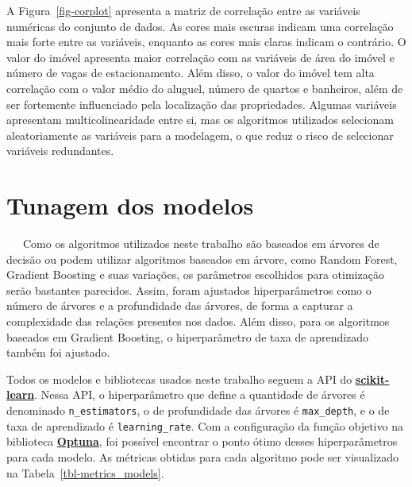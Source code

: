 \documentclass[
  12pt,
  a4paper,
]{scrreprt}
\begin{document}
\vspace{12pt}

A Figura~\ref{fig-corplot} apresenta a matriz de correlação entre as
variáveis numéricas do conjunto de dados. As cores mais escuras indicam
uma correlação mais forte entre as variáveis, enquanto as cores mais
claras indicam o contrário. O valor do imóvel apresenta maior correlação
com as variáveis de área do imóvel e número de vagas de estacionamento.
Além disso, o valor do imóvel tem alta correlação com o valor médio do
aluguel, número de quartos e banheiros, além de ser fortemente
influenciado pela localização das propriedades. Algumas variáveis
apresentam multicolinearidade entre si, mas os algoritmos utilizados
selecionam aleatoriamente as variáveis para a modelagem, o que reduz o
risco de selecionar variáveis redundantes.

\section{Tunagem dos modelos}\label{tunagem-dos-modelos}

~~~Como os algoritmos utilizados neste trabalho são baseados em árvores
de decisão ou podem utilizar algoritmos baseados em árvore, como Random
Forest, Gradient Boosting e suas variações, os parâmetros escolhidos
para otimização serão bastantes parecidos. Assim, foram ajustados
hiperparâmetros como o número de árvores e a profundidade das árvores,
de forma a capturar a complexidade das relações presentes nos dados.
Além disso, para os algoritmos baseados em Gradient Boosting, o
hiperparâmetro de taxa de aprendizado também foi ajustado.

\vspace{12pt}

Todos os modelos e bibliotecas usados neste trabalho seguem a API do
\href{https://scikit-learn.org/stable/}{\textbf{scikit-learn}}. Nessa
API, o hiperparâmetro que define a quantidade de árvores é denominado
\texttt{n\_estimators}, o de profundidade das árvores é
\texttt{max\_depth}, e o de taxa de aprendizado é
\texttt{learning\_rate}. Com a configuração da função objetivo na
biblioteca \href{https://optuna.org/}{\textbf{Optuna}}, foi possível
encontrar o ponto ótimo desses hiperparâmetros para cada modelo. As
métricas obtidas para cada algoritmo pode ser visualizado na
Tabela~\ref{tbl-metrics_models}.
\end{document}
